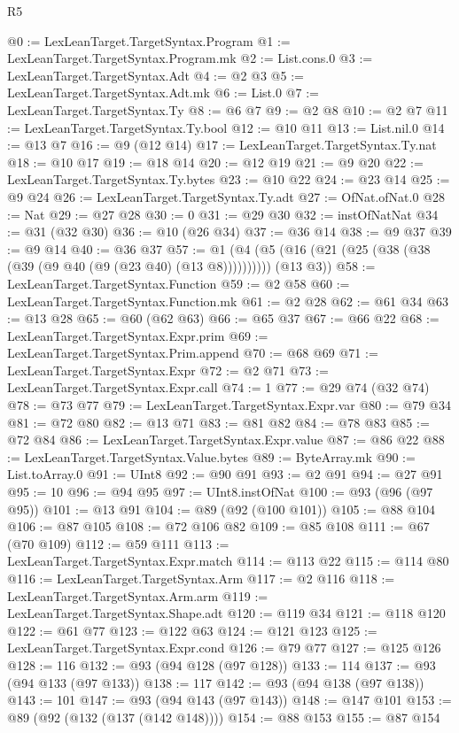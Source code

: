 \begin{lexlean}{R5}
\begin{coremodule}
{{{{{{{{{{{{{{{{{{{{{{{{{{{{{{{{{{{{{{{{{{{{{{{{{{{{{{{{{{{{{{{{{{{{{{{{{{{{{{{{{{{{{{{{{{{{@0 := LexLeanTarget.TargetSyntax.Program
@1 := LexLeanTarget.TargetSyntax.Program.mk
@2 := List.cons.{0}
@3 := LexLeanTarget.TargetSyntax.Adt
@4 := @2 @3
@5 := LexLeanTarget.TargetSyntax.Adt.mk
@6 := List.{0}
@7 := LexLeanTarget.TargetSyntax.Ty
@8 := @6 @7
@9 := @2 @8
@10 := @2 @7
@11 := LexLeanTarget.TargetSyntax.Ty.bool
@12 := @10 @11
@13 := List.nil.{0}
@14 := @13 @7
@16 := @9 (@12 @14)
@17 := LexLeanTarget.TargetSyntax.Ty.nat
@18 := @10 @17
@19 := @18 @14
@20 := @12 @19
@21 := @9 @20
@22 := LexLeanTarget.TargetSyntax.Ty.bytes
@23 := @10 @22
@24 := @23 @14
@25 := @9 @24
@26 := LexLeanTarget.TargetSyntax.Ty.adt
@27 := OfNat.ofNat.{0}
@28 := Nat
@29 := @27 @28
@30 := 0
@31 := @29 @30
@32 := instOfNatNat
@34 := @31 (@32 @30)
@36 := @10 (@26 @34)
@37 := @36 @14
@38 := @9 @37
@39 := @9 @14
@40 := @36 @37
@57 := @1 (@4 (@5 (@16 (@21 (@25 (@38 (@38 (@39 (@9 @40 (@9 (@23 @40) (@13 @8)))))))))) (@13 @3))
@58 := LexLeanTarget.TargetSyntax.Function
@59 := @2 @58
@60 := LexLeanTarget.TargetSyntax.Function.mk
@61 := @2 @28
@62 := @61 @34
@63 := @13 @28
@65 := @60 (@62 @63)
@66 := @65 @37
@67 := @66 @22
@68 := LexLeanTarget.TargetSyntax.Expr.prim
@69 := LexLeanTarget.TargetSyntax.Prim.append
@70 := @68 @69
@71 := LexLeanTarget.TargetSyntax.Expr
@72 := @2 @71
@73 := LexLeanTarget.TargetSyntax.Expr.call
@74 := 1
@77 := @29 @74 (@32 @74)
@78 := @73 @77
@79 := LexLeanTarget.TargetSyntax.Expr.var
@80 := @79 @34
@81 := @72 @80
@82 := @13 @71
@83 := @81 @82
@84 := @78 @83
@85 := @72 @84
@86 := LexLeanTarget.TargetSyntax.Expr.value
@87 := @86 @22
@88 := LexLeanTarget.TargetSyntax.Value.bytes
@89 := ByteArray.mk
@90 := List.toArray.{0}
@91 := UInt8
@92 := @90 @91
@93 := @2 @91
@94 := @27 @91
@95 := 10
@96 := @94 @95
@97 := UInt8.instOfNat
@100 := @93 (@96 (@97 @95))
@101 := @13 @91
@104 := @89 (@92 (@100 @101))
@105 := @88 @104
@106 := @87 @105
@108 := @72 @106 @82
@109 := @85 @108
@111 := @67 (@70 @109)
@112 := @59 @111
@113 := LexLeanTarget.TargetSyntax.Expr.match
@114 := @113 @22
@115 := @114 @80
@116 := LexLeanTarget.TargetSyntax.Arm
@117 := @2 @116
@118 := LexLeanTarget.TargetSyntax.Arm.arm
@119 := LexLeanTarget.TargetSyntax.Shape.adt
@120 := @119 @34
@121 := @118 @120
@122 := @61 @77
@123 := @122 @63
@124 := @121 @123
@125 := LexLeanTarget.TargetSyntax.Expr.cond
@126 := @79 @77
@127 := @125 @126
@128 := 116
@132 := @93 (@94 @128 (@97 @128))
@133 := 114
@137 := @93 (@94 @133 (@97 @133))
@138 := 117
@142 := @93 (@94 @138 (@97 @138))
@143 := 101
@147 := @93 (@94 @143 (@97 @143))
@148 := @147 @101
@153 := @89 (@92 (@132 (@137 (@142 @148))))
@154 := @88 @153
@155 := @87 @154
}}}}}}}}}}}}}}}}}}}}}}}}}}}}}}}}}}}}}}}}}}}}}}}}}}}}}}}}}}}}}}}}}}}}}}}}}}}}}}}}}}}}}}}}}}}}
\end{coremodule}
\end{lexlean}
